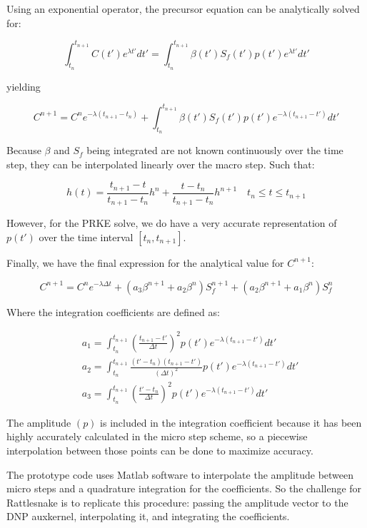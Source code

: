 \documentclass[12pt]{scrartcl}
\newcommand{\be}{\begin{equation}}
\newcommand{\ee}{\end{equation}}
\begin{document}
Using an exponential operator, the precursor equation can be analytically solved for:

\be
\int_{t_n}^{t_{n+1}} C(t')e^{\lambda t'} dt' = \int_{t_n}^{t_{n+1}} \beta(t') S_f(t') p(t')e^{\lambda t'}dt'
\ee

yielding

\be
C^{n+1} =  C^n e^{-\lambda (t_{n+1} - t_n) }  + \int_{t_n}^{t_{n+1}} \beta(t') S_f(t') p(t')e^{-\lambda (t_{n+1}-t')}dt'
\ee

Because $\beta$ and $S_f$ being integrated are not known continuously over the time step, they can be interpolated linearly over the macro step.  Such that:

\be
h(t) = \frac{t_{n+1}-t}{t_{n+1}-t_n}h^n  + \frac{t-t_n}{t_{n+1}-t_n}h^{n+1}  \quad t_n \le t \le t_{n+1}
\ee

However, for the PRKE solve, we do have a very accurate representation of $p(t')$ over the time interval $[t_n,t_{n+1}]$.

Finally, we have the final expression for the analytical value for $C^{n+1}$:

\be
C^{n+1} = C^n e^{-\lambda \Delta t} 
+ \left(a_3\beta^{n+1}+a_2\beta^n\right)S_f^{n+1}
+ \left(a_2\beta^{n+1}+a_1\beta^n\right)S_f^n 
\ee

Where the integration coefficients are defined as:

\begin{align}
&a_1 = \int_{t_n}^{t_{n+1}}\left(\frac{t_{n+1}-t'}{\Delta t}\right)^2p(t')e^{-\lambda(t_{n+1}-t')}dt' \\
&a_2= \int_{t_n}^{t_{n+1}}\frac{(t'-t_n)(t_{n+1}-t')}{(\Delta t)^2}p(t')e^{-\lambda(t_{n+1}-t')}dt' \\
&a_3 = \int_{t_n}^{t_{n+1}}\left(\frac{t'-t_n}{\Delta t}\right)^2p(t')e^{-\lambda(t_{n+1}-t')}dt'
\end{align}

The amplitude $(p)$ is included in the integration coefficient because it has been highly accurately calculated in the micro step scheme, so a piecewise interpolation between those points can be done to maximize accuracy.  

The prototype code uses Matlab software to interpolate the amplitude between micro steps and a quadrature integration for the coefficients.  So the challenge for Rattlesnake is to replicate this procedure: passing the amplitude vector to the DNP auxkernel, interpolating it, and integrating the coefficients. 
\end{document}
